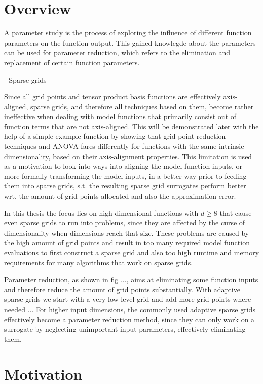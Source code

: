 \documentclass[
  a4paper,  %
  twoside,  %
  bibliography=totoc,
  headsepline,
  cleardoublepage=empty,
  parskip=half,
  draft=false
]{scrbook}
\begin{document}
\section{Overview}


A parameter study is the process of exploring the influence of different function parameters on the function output.
This gained knowlegde about the parameters can be used for parameter reduction, which refers to the elimination and replacement of certain function parameters.

- Sparse grids

Since all grid points and tensor product basis functions are effectively axis-aligned, sparse grids, and therefore all techniques based on them, become rather ineffective when dealing with model functions that primarily consist out of function terms that are not axis-aligned.
This will be demonstrated later with the help of a simple example function by showing that grid point reduction techniques and ANOVA fares differently for functions with the same intrinsic dimensionality, based on their axis-alignment properties.
This limitation is used as a motivation to look into ways into aligning the model function inputs, or more formally transforming the model inputs, in a better way prior to feeding them into sparse grids, s.t. the resulting sparse grid surrogates perform better wrt. the amount of grid points allocated and also the approximation error. 

In this thesis the focus lies on high dimensional functions with $d \geq 8$ that cause even sparse grids to run into problems, since they are affected by the curse of dimensionality when dimensions reach that size.
These problems are caused by the high amount of grid points and result in too many required model function evaluations to first construct a sparse grid and also too high runtime and memory requirements for many algorithms that work on sparse grids.


Parameter reduction, as shown in fig ..., aims at eliminating some function inputs and therefore reduce the amount of grid points substantially.
With adaptive sparse grids we start with a very low level grid and add more grid points where needed ...
For higher input dimensions, the commonly used adaptive sparse grids effectively become a parameter reduction method, since they can only work on a surrogate by neglecting unimportant input parameters, effectively eliminating them.


\section{Motivation}
\end{document}
